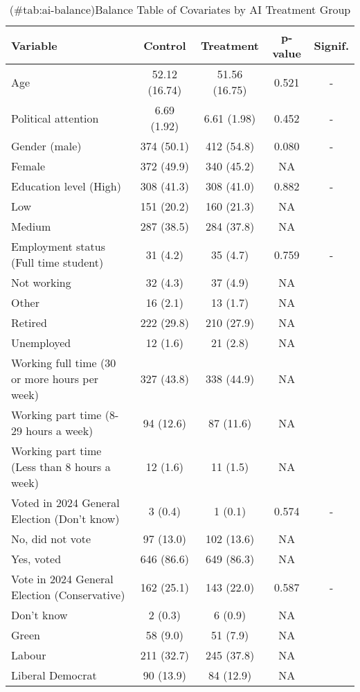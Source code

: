 \begin{table}
\centering
\caption{(\#tab:ai-balance)Balance Table of Covariates by AI Treatment Group \label{tab:ai-balance}}
\centering
\fontsize{10}{12}\selectfont
\begin{threeparttable}
\begin{tabular}[t]{lcccc}
\toprule
Variable & Control & Treatment & p-value & Signif.\\
\midrule
Age & 52.12 (16.74) & 51.56 (16.75) & 0.521 & -\\
Political attention & 6.69 (1.92) & 6.61 (1.98) & 0.452 & -\\
Gender (male) & 374 (50.1) & 412 (54.8) & 0.080 & -\\
Female & 372 (49.9) & 340 (45.2) & NA & \\
Education level (High) & 308 (41.3) & 308 (41.0) & 0.882 & -\\
\addlinespace
Low & 151 (20.2) & 160 (21.3) & NA & \\
Medium & 287 (38.5) & 284 (37.8) & NA & \\
Employment status (Full time student) & 31 (4.2) & 35 (4.7) & 0.759 & -\\
Not working & 32 (4.3) & 37 (4.9) & NA & \\
Other & 16 (2.1) & 13 (1.7) & NA & \\
\addlinespace
Retired & 222 (29.8) & 210 (27.9) & NA & \\
Unemployed & 12 (1.6) & 21 (2.8) & NA & \\
Working full time (30 or more hours per week) & 327 (43.8) & 338 (44.9) & NA & \\
Working part time (8-29 hours a week) & 94 (12.6) & 87 (11.6) & NA & \\
Working part time (Less than 8 hours a week) & 12 (1.6) & 11 (1.5) & NA & \\
\addlinespace
Voted in 2024 General Election (Don't know) & 3 (0.4) & 1 (0.1) & 0.574 & -\\
No, did not vote & 97 (13.0) & 102 (13.6) & NA & \\
Yes, voted & 646 (86.6) & 649 (86.3) & NA & \\
Vote in 2024 General Election (Conservative) & 162 (25.1) & 143 (22.0) & 0.587 & -\\
Don't know & 2 (0.3) & 6 (0.9) & NA & \\
\addlinespace
Green & 58 (9.0) & 51 (7.9) & NA & \\
Labour & 211 (32.7) & 245 (37.8) & NA & \\
Liberal Democrat & 90 (13.9) & 84 (12.9) & NA & \\

\end{tabular}
\end{threeparttable}
\end{table}
